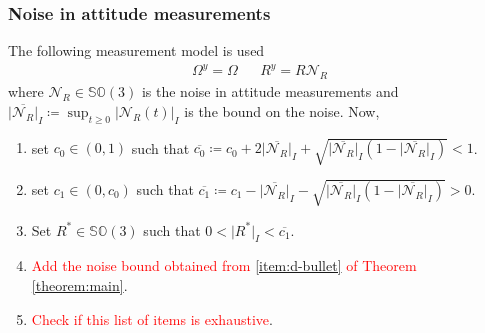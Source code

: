 \documentclass{article}
\newcommand{\SOthree}{\mathbb{SO}(3)}
\newcommand{\Omegay}{\Omega^y}
\newcommand{\normSOthree}[1]{{{\vert}#1 {\vert}_I}}
\newcommand{\Rstar}{{R^*}}
\newcommand{\noiseatt}{\mathcal{N}_R}
\newcommand{\maxnoiseatt}{\normSOthree{\overline{\noiseatt}}}
\newcommand{\cobar}{\overline{c_0}}
\begin{document}
\subsubsection{Noise in attitude measurements}
The following measurement model is used
\begin{align}\label{eq:measurement_model_ISS_att}
    \Omegay = \Omega  && R^y = R \noiseatt
\end{align}
where $\noiseatt\in\SOthree$ is the noise in attitude measurements and $\maxnoiseatt\coloneqq \sup_{t\geq 0}\normSOthree{\noiseatt(t)}$ is the bound on the noise.  Now,
\begin{enumerate}[label={(\Alph*)}]
    \item set $c_0\in(0,1)$ such that $\cobar\coloneqq c_0 + 2\maxnoiseatt + \sqrt{\maxnoiseatt(1-\maxnoiseatt)}  < 1 $. \label{item-A}
    \item set $c_1\in (0,c_0)$ such that $\overline{c_1} \coloneqq c_1 - \maxnoiseatt - \sqrt{\maxnoiseatt(1-\maxnoiseatt)} > 0$.\label{item-B}
    \item Set $\Rstar\in\SOthree$ such that $0 < \normSOthree{\Rstar} < \overline{c_1}$. \label{item-C}
    \item \textcolor{red}{Add the noise bound obtained from \ref{item:d-bullet} of Theorem \ref{theorem:main}}. 
    \item \textcolor{red}{Check if this list of items is exhaustive}. 
\end{enumerate}
\end{document}
